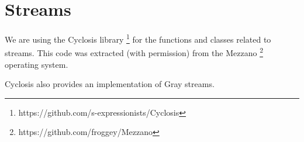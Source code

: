 \chapter{Streams}

We are using the Cyclosis library%
\footnote{https://github.com/s-expressionists/Cyclosis} for the
\commonlisp{} functions and classes related to streams.  This code was
extracted (with permission) from the Mezzano%
\footnote{https://github.com/froggey/Mezzano}
operating system.

Cyclosis also provides an implementation of Gray streams.

